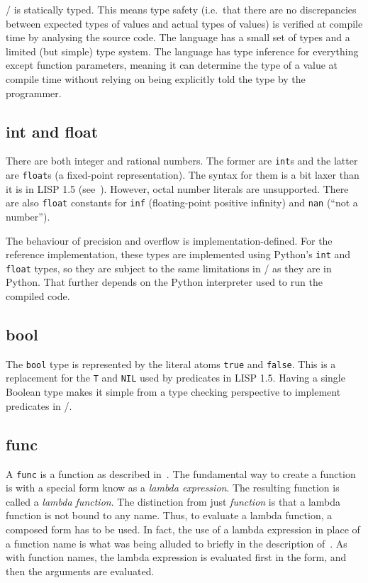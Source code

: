 \lispy/ is statically typed. This means type safety (i.e.\ that there are no discrepancies between expected types of values and actual types of values) is verified at compile time by analysing the source code. The language has  a small set of types and a limited (but simple) type system. The language has type inference for everything except function parameters, meaning it can determine the type of a value at compile time without relying on being explicitly told the type by the programmer.

\subsection{int and float}
There are both integer and rational numbers. The former are \texttt{int}s and the latter are \texttt{float}s (a fixed-point representation). The syntax for them is a bit laxer than it is in LISP 1.5 (see~). However, octal number literals are unsupported. There are also \texttt{float} constants for \texttt{inf} (floating-point positive infinity) and \texttt{nan} (``not a number'').

The behaviour of precision and overflow is implementation-defined. For the reference implementation, these types are implemented using Python's \texttt{int} and \texttt{float} types, so they are subject to the same limitations in \lispy/ as they are in Python. That further depends on the Python interpreter used to run the compiled code.

\subsection{bool}
The \texttt{bool} type is represented by the literal atoms \texttt{true} and \texttt{false}. This is a replacement for the \texttt{T} and \texttt{NIL} used by predicates in LISP 1.5. Having a single Boolean type makes it simple from a type checking perspective to implement predicates in \lispy/.

\subsection{func} \label{subsec:func}
A \texttt{func} is a function as described in~. The fundamental way to create a function is with a special form know as a \textit{lambda expression}. The resulting function is called a \textit{lambda function}. The distinction from just \textit{function} is that a lambda function is not bound to any name. Thus, to evaluate a lambda function, a composed form has to be used. In fact, the use of a lambda expression in place of a function name is what was being alluded to briefly in the description of~. As with function names, the lambda expression is evaluated first in the form, and then the arguments are evaluated.

